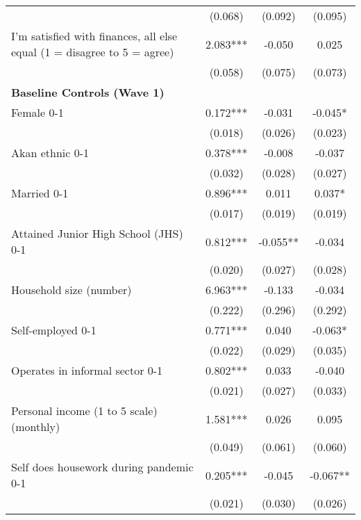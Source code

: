 \begin{ThreePartTable}
\begin{table}[tbp]
\begin{tabular}{lccc}
                   &      (0.068)     &      (0.092)     &      (0.095)     \\ [0.1em] 
 I'm satisfied with finances, all else equal (1 = disagree to 5 = agree) & 2.083*** & -0.050 & 0.025 \\ [0.1em] 
                   &      (0.058)     &      (0.075)     &      (0.073)     \\ [0.1em] 
\textbf{Baseline Controls (Wave 1)} & & & \\ 
 Female 0-1 & 0.172*** & -0.031 & -0.045* \\ [0.1em] 
                   &      (0.018)     &      (0.026)     &      (0.023)     \\ [0.1em] 
 Akan ethnic 0-1 & 0.378*** & -0.008 & -0.037 \\ [0.1em] 
                   &      (0.032)     &      (0.028)     &      (0.027)     \\ [0.1em] 
 Married 0-1 & 0.896*** & 0.011 & 0.037* \\ [0.1em] 
                   &      (0.017)     &      (0.019)     &      (0.019)     \\ [0.1em] 
 Attained Junior High School (JHS) 0-1 & 0.812*** & -0.055** & -0.034 \\ [0.1em] 
                   &      (0.020)     &      (0.027)     &      (0.028)     \\ [0.1em] 
 Household size (number) & 6.963*** & -0.133 & -0.034 \\ [0.1em] 
                   &      (0.222)     &      (0.296)     &      (0.292)     \\ [0.1em] 
 Self-employed 0-1 & 0.771*** & 0.040 & -0.063* \\ [0.1em] 
                   &      (0.022)     &      (0.029)     &      (0.035)     \\ [0.1em] 
 Operates in informal sector 0-1 & 0.802*** & 0.033 & -0.040 \\ [0.1em] 
                   &      (0.021)     &      (0.027)     &      (0.033)     \\ [0.1em] 
 Personal income (1 to 5 scale) (monthly) & 1.581*** & 0.026 & 0.095 \\ [0.1em] 
                   &      (0.049)     &      (0.061)     &      (0.060)     \\ [0.1em] 
 Self does housework during pandemic 0-1 & 0.205*** & -0.045 & -0.067** \\ [0.1em] 
                   &      (0.021)     &      (0.030)     &      (0.026)     \\ [0.1em] 

\end{tabular}
\end{table}
\end{ThreePartTable}
